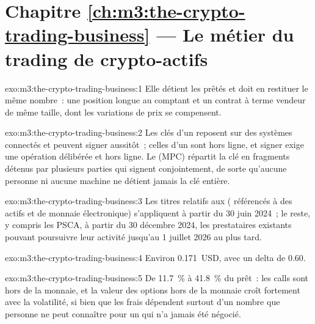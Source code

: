 \section*{Chapitre \ref{ch:m3:the-crypto-trading-business} --- Le métier du trading de crypto-actifs}

\begin{solution}{exo:m3:the-crypto-trading-business:1}
Elle détient les  prêtés et doit en restituer le même nombre~: une position longue au comptant et un contrat à terme
vendeur de même taille, dont les variations de prix se compensent.
\end{solution}

\begin{solution}{exo:m3:the-crypto-trading-business:2}
Les clés d'un  reposent sur des systèmes connectés et peuvent signer aussitôt~; celles d'un  sont hors ligne, et signer
exige une opération délibérée et hors ligne. Le  (MPC) répartit la clé en fragments détenus par plusieurs parties qui signent
conjointement, de sorte qu'aucune personne ni aucune machine ne détient jamais la clé entière.
\end{solution}

\begin{solution}{exo:m3:the-crypto-trading-business:3}
Les titres relatifs aux  ( référencés à des actifs et  de monnaie électronique) s'appliquent à partir du 30 juin 2024~; le reste, y compris les PSCA,
à partir du 30 décembre 2024, les prestataires existants pouvant poursuivre leur activité jusqu'au 1 juillet 2026 au plus tard.
\end{solution}

\begin{solution}{exo:m3:the-crypto-trading-business:4}
Environ 0.171~USD, avec un delta de 0.60.
\end{solution}

\begin{solution}{exo:m3:the-crypto-trading-business:5}
De 11.7~\% à 41.8~\% du prêt~: les calls sont hors de la monnaie, et la valeur des options hors de la monnaie croît fortement avec
la volatilité, si bien que les frais dépendent surtout d'un nombre que personne ne peut connaître pour un  qui n'a jamais été négocié.
\end{solution}

